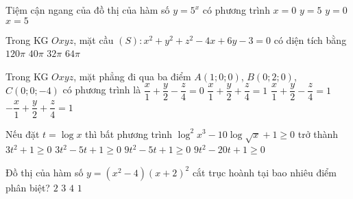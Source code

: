 \begin{ex}%
Tiệm cận ngang của đồ thị của hàm số $y=5^x$ có phương trình
\choice
{$x=0$}
{$y=5$}
{\True $y=0$}
{$x=5$}
\end{ex}

\begin{ex}%
Trong KG $Oxyz$, mặt cầu $(S)\colon x^2+y^2+z^2-4x+6y-3=0$ có diện tích bằng
\choice
{$120 \pi$}
{$40 \pi$}
{$32 \pi$}
{\True $64 \pi$}
\end{ex}

\begin{ex}%
Trong KG $Oxyz$, mặt phẳng đi qua ba điểm $A(1; 0; 0)$, $B(0; 2; 0)$, $C(0; 0;-4)$ có phương trình là
\choice
{$\dfrac{x}{1}+\dfrac{y}{2}-\dfrac{z}{4}=0$}
{$\dfrac{x}{1}+\dfrac{y}{2}+\dfrac{z}{4}=1$}
{\True $\dfrac{x}{1}+\dfrac{y}{2}-\dfrac{z}{4}=1$}
{$-\dfrac{x}{1}+\dfrac{y}{2}+\dfrac{z}{4}=1$}
\end{ex}

\begin{ex}%
Nếu đặt $t=\log x$ thì bất phương trình $\log^2x^3-10\log\sqrt{x}+1\ge 0$ trở thành
\choice
{$3t^2+1 \ge 0$}
{$3t^2-5t+1 \ge 0$}
{\True $9t^2-5t+1 \ge 0$}
{$9t^2-20t+1 \ge 0$}
\end{ex}

\begin{ex}%
Đồ thị của hàm số $y=\left(x^2-4\right)(x+2)^2$ cắt trục hoành tại bao nhiêu điểm phân biệt?
\choice
{\True $2$}
{$3$}
{$4$}
{$1$}
\end{ex}

